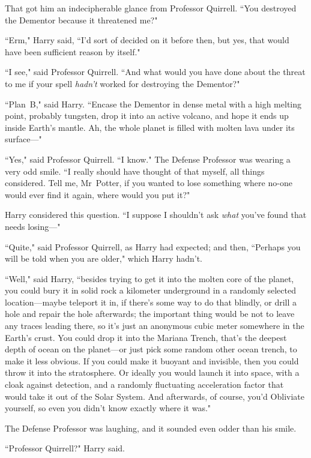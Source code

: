 That got him an indecipherable glance from Professor Quirrell. ``You destroyed the Dementor because it threatened me?"

``Erm," Harry said, ``I'd sort of decided on it before then, but yes, that would have been sufficient reason by itself."

``I see," said Professor Quirrell. ``And what would you have done about the threat to me if your spell \emph{hadn't} worked for destroying the Dementor?"

``Plan~B," said Harry. ``Encase the Dementor in dense metal with a high melting point, probably tungsten, drop it into an active volcano, and hope it ends up inside Earth's mantle. Ah, the whole planet is filled with molten lava under its surface—"

``Yes," said Professor Quirrell. ``I know." The Defense Professor was wearing a very odd smile. ``I really should have thought of that myself, all things considered. Tell me, Mr~Potter, if you wanted to lose something where no-one would ever find it again, where would you put it?"

Harry considered this question. ``I suppose I shouldn't ask \emph{what} you've found that needs losing—"

``Quite," said Professor Quirrell, as Harry had expected; and then, ``Perhaps you will be told when you are older," which Harry hadn't.

``Well," said Harry, ``besides trying to get it into the molten core of the planet, you could bury it in solid rock a kilometer underground in a randomly selected location—maybe teleport it in, if there's some way to do that blindly, or drill a hole and repair the hole afterwards; the important thing would be not to leave any traces leading there, so it's just an anonymous cubic meter somewhere in the Earth's crust. You could drop it into the Mariana Trench, that's the deepest depth of ocean on the planet—or just pick some random other ocean trench, to make it less obvious. If you could make it buoyant and invisible, then you could throw it into the stratosphere. Or ideally you would launch it into space, with a cloak against detection, and a randomly fluctuating acceleration factor that would take it out of the Solar System. And afterwards, of course, you'd Obliviate yourself, so even you didn't know exactly where it was."

The Defense Professor was laughing, and it sounded even odder than his smile.

``Professor Quirrell?" Harry said.

